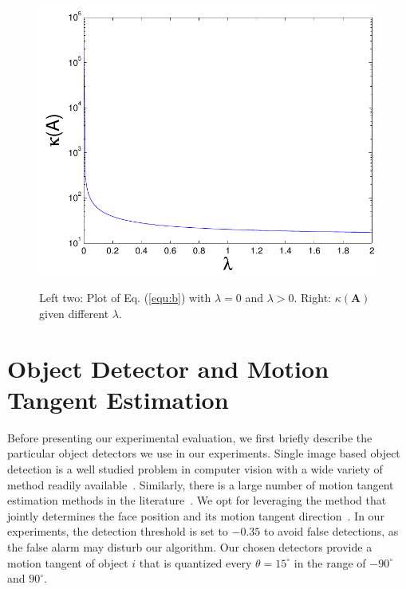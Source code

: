\begin{figure}[t]
{    \includegraphics[height=0.17\textheight]{chapter4/resource/conditionNum_lamda.pdf}
    \label{fig:conditionNum_lamda}
}
\caption{Left two: Plot of Eq. (\ref{equ:b}) with $\lambda=0$ and $\lambda>0$. Right: $\kappa(\mathbf{A})$ given different $\lambda$.}
\label{fig:b}
\end{figure}


\section{Object Detector and Motion Tangent Estimation}
\label{sec:face_detection}
Before presenting our experimental evaluation, we first briefly describe the particular object detectors we use in our experiments.
Single image based object detection is a well studied problem in computer vision with a wide variety of method readily available~\cite{Zhang2006Local,Dalal2005HOG,lsvm-pami}. Similarly, there is a large number of motion tangent estimation methods in the literature~\cite{Blanz2003face,Gu20063D,jain2010fddb,jones2003fast}.
We opt for leveraging the method that jointly determines the face position and its motion tangent direction~\cite{Xiangxin_CVPR12}.
In our experiments,
the detection threshold is set to $-0.35$ to avoid false detections, as the false alarm may disturb our algorithm. Our chosen detectors provide a motion tangent of object $i$ that is  quantized every $\theta=15^{\circ}$ in the range of $-90^{\circ}$ and $90^{\circ}$.

